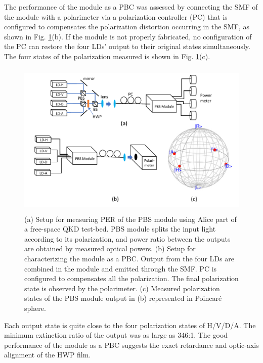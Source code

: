 \documentclass[letterpaper, 10pt]{article}
\begin{document}
The performance of the module as a PBC was assessed by connecting the SMF of the module with a polarimeter via a polarization controller (PC) that is configured to compensates the polarization distortion occurring in the SMF, as shown in Fig. \ref{fig:meas_setup}(b).
If the module is not properly fabricated, no configuration of the PC can restore the four LDs' output to their original states simultaneously.
The four states of the polarization measured is shown in Fig. \ref{fig:meas_setup}(c).
\begin{figure}
  \centering
  \includegraphics[height=7.5cm]{meas_setup}
  \caption{(a) Setup for measuring PER of the PBS module using Alice part of a free-space QKD test-bed. PBS module splits the input light according to its polarization, and power ratio between the outputs are obtained by measured optical powers.  (b) Setup for characterizing the module as a PBC. Output from the four LDs are combined in the module and emitted through the SMF. PC is configured to compensates all the polarization. The final polarization state  is observed by the polarimeter. (c) Measured polarization states of the PBS module output in (b) represented in Poincar\'{e} sphere.}
  \label{fig:meas_setup}
\end{figure}
Each output state is quite close to the four polarization states of H/V/D/A.
The minimum extinction ratio of the output was as large as 346:1.
The good performance of the module as a PBC suggests the exact retardance and optic-axis alignment of the HWP film.
\end{document}
